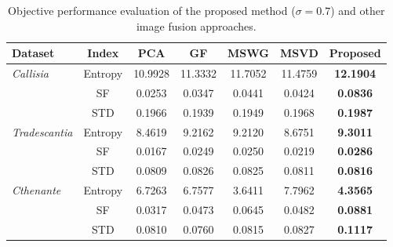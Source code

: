 \begin{table}[ht]
    \centering
    \caption{Objective performance evaluation of the proposed method ($\sigma = 0.7$) and other image fusion approaches.}
    \label{tab:fusion_performance_comparison}
    \begin{tabular}{lcccccc}
        \toprule
        Dataset & Index & PCA & GF & MSWG & MSVD & \textbf{Proposed}\\
        \midrule
        
        \multirow{3}{*}{\textit{\small Callisia}} 
        & \small Entropy & 10.9928 & 11.3332 & 11.7052 & 11.4759 & \textbf{12.1904}\\
        & \small SF & 0.0253 & 0.0347 & 0.0441 & 0.0424 & \textbf{0.0836}\\
        & \small STD & 0.1966 & 0.1939 & 0.1949 & 0.1968 & \textbf{0.1987}\\
        
        \midrule
        
        \multirow{3}{*}{\textit{\small Tradescantia}}
        & \small Entropy & 8.4619 & 9.2162 & 9.2120 & 8.6751 & \textbf{9.3011}\\
        & \small SF & 0.0167 & 0.0249 & 0.0250 & 0.0219 & \textbf{0.0286}\\
        & \small STD & 0.0809 & 0.0826 & 0.0825 & 0.0811 & \textbf{0.0816}\\
        
        \midrule

        \multirow{3}{*}{\textit{\small Cthenante}}
        & \small Entropy & 6.7263 & 6.7577 & 3.6411 & 7.7962 & \textbf{4.3565}\\
        & \small SF & 0.0317 & 0.0473 & 0.0645 & 0.0482 & \textbf{0.0881}\\
        & \small STD & 0.0810 & 0.0760 & 0.0815 & 0.0827 & \textbf{0.1117}\\
        


        \bottomrule
    \end{tabular}
    \centering
    \fautor
\end{table}

